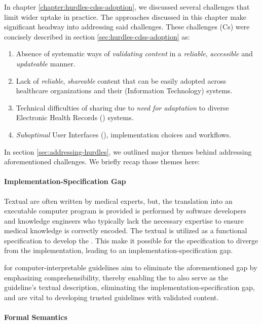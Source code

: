In chapter \ref{chapter:hurdles-cdss-adoption}, we discussed several
challenges that limit wider \CDSSs{} uptake in practice. The
approaches discussed in this chapter make significant headway into
addressing said challenges. These challenges (Cs) were concisely
described in section \ref{sec:hurdles-cdss-adoption} as:
\begin{enumerate}[label=C\arabic*.]
\itemsep0.0em
\item Absence of systematic ways of \emph{validating content}
in a \emph{reliable}, \emph{accessible} and \emph{updateable} manner.
\item Lack of \emph{reliable}, \emph{shareable} \CDSS{} content
that can be easily adopted across healthcare organizations and their (Information
Technology) \IT{} systems.
\item Technical difficulties of sharing due to \emph{need for
  adaptation} to diverse Electronic Health Records (\EHR) systems.
\item \emph{Suboptimal} User Interfaces (\UIs), implementation choices and
workflows.
\end{enumerate}

In section \ref{sec:addressing-hurdles}, we outlined major
themes behind addressing aforementioned challenges. We briefly
recap those themes here:

\paragraph{Implementation-Specification Gap}

Textual \BPGs{} are often written by medical experts, but,
the translation into an executable computer program is
provided is performed by software developers and knowledge
engineers who typically lack the necessary expertise to ensure
medical knowledge is correctly encoded. The textual \BPG{} is
utilized as a functional specification to develop the \CDSSs{}.
This make it possible for the specification to diverge from the
implementation, leading to an implementation-specification gap.

\DSLs{} for computer-interpretable guidelines aim to eliminate
the aforementioned gap by emphasizing \HCP{} comprehensibility,
thereby enabling the \CIG{} to also serve as the guideline's
textual description, eliminating the implementation-specification gap,
and are vital to developing trusted guidelines with validated content.

\paragraph{Formal Semantics}

